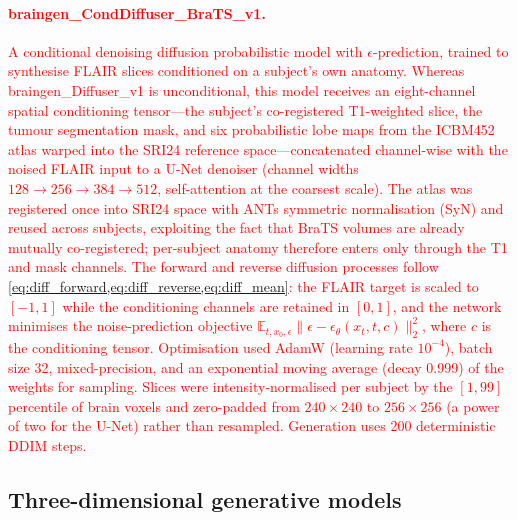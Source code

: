 \documentclass[11pt]{article}
\begin{document}
\paragraph{\textcolor{red}{braingen\_CondDiffuser\_BraTS\_v1.}} \textcolor{red}{A conditional denoising diffusion probabilistic model\cite{ho2020denoising} with $\epsilon$-prediction, trained to synthesise FLAIR slices conditioned on a subject's own anatomy. Whereas braingen\_Diffuser\_v1 is unconditional, this model receives an eight-channel spatial conditioning tensor---the subject's co-registered T1-weighted slice, the tumour segmentation mask, and six probabilistic lobe maps from the ICBM452 atlas\cite{mazziotta2001probabilistic} warped into the SRI24\cite{rohlfing2010sri24} reference space---concatenated channel-wise with the noised FLAIR input to a U-Net denoiser (channel widths $128\!\to\!256\!\to\!384\!\to\!512$, self-attention at the coarsest scale). The atlas was registered once into SRI24 space with ANTs symmetric normalisation (SyN)\cite{avants2008syn} and reused across subjects, exploiting the fact that BraTS volumes are already mutually co-registered; per-subject anatomy therefore enters only through the T1 and mask channels. The forward and reverse diffusion processes follow \cref{eq:diff_forward,eq:diff_reverse,eq:diff_mean}: the FLAIR target is scaled to $[-1,1]$ while the conditioning channels are retained in $[0,1]$, and the network minimises the noise-prediction objective $\mathbb{E}_{t,x_{0},\epsilon}\lVert \epsilon - \epsilon_{\theta}(x_{t},t,c)\rVert_{2}^{2}$, where $c$ is the conditioning tensor. Optimisation used AdamW (learning rate $10^{-4}$), batch size 32, mixed-precision, and an exponential moving average (decay 0.999) of the weights for sampling. Slices were intensity-normalised per subject by the $[1,99]$ percentile of brain voxels and zero-padded from $240\!\times\!240$ to $256\!\times\!256$ (a power of two for the U-Net) rather than resampled. Generation uses 200 deterministic DDIM\cite{song2021ddim} steps.}

\subsection*{Three-dimensional generative models}
\end{document}
